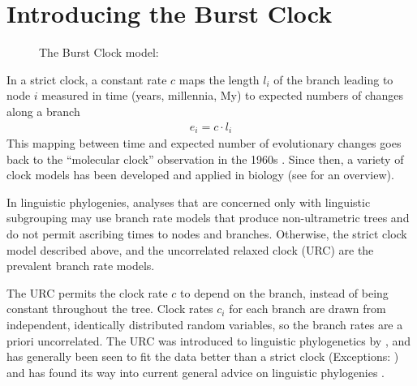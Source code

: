 \documentclass[a4paper,12pt]{scrartcl}
\begin{document}
\section{Introducing the Burst Clock}\label{s:description}
\begin{figure}
    \centering
    \caption{The Burst Clock model: }
    \label{f:burstclock}
\end{figure}
In a strict clock,
a constant rate $c$ maps the length $l_i$ of the branch leading to node $i$
measured in time (years, millennia, My) to expected numbers of changes
along a branch
\begin{align}
  e_i = c \cdot l_i
  \label{eq:strict}
\end{align}
This mapping between time and expected number of evolutionary changes goes back
to the “molecular clock” observation in the 1960s
\parencite{zuckerkandl1965evolutionary}. Since then, a variety of clock models
has been developed and applied in biology (see \textcite{ho2014molecularclock} for an
overview).

In linguistic phylogenies,
analyses that are
concerned only with linguistic subgrouping may use branch rate models that
produce non-ultrametric trees and do not permit ascribing times to nodes and
branches.
Otherwise, the strict clock model described above, and the uncorrelated relaxed
clock (URC) are the prevalent branch rate models.

The URC \parencite{drummond2006relaxed} permits the clock rate $c$ to depend on
the branch, instead of being constant throughout the tree. Clock
rates $c_i$ for each branch are drawn from independent, identically distributed random
variables, so the branch rates are a priori uncorrelated.
The URC was introduced to linguistic
phylogenetics by \textcite{kitchen2009bayesian}, and has generally been seen to
fit the data better than a strict clock
\parencite{bouckaert2012mapping,honkola2013cultural,lee2013evolution}
(Exceptions: \textcite{savelyev2020bayesian,kaiping2021systematic})
and has found its way into current general advice on linguistic phylogenies
\parencite{maurits2017beastling,hoffmann2021bayesian}.
\end{document}
